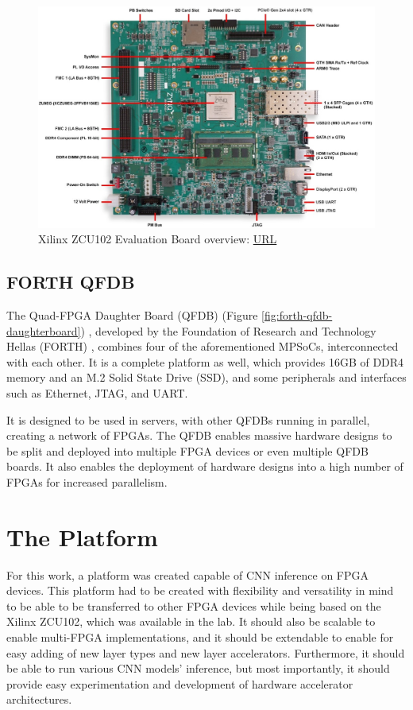\begin{figure} [H]
	\centering
	\includegraphics[width=\textwidth]{Images/Hardware/ZCU102-board-overview.jpg}
	\decoRule
	\caption[Xilinx ZCU102 Evaluation Board overview]{Xilinx ZCU102 Evaluation Board overview: \href{https://www.xilinx.com/products/boards-and-kits/ek-u1-zcu102-g.html}{URL}}
	\label{fig:ZCU102-board-overview}
\end{figure}

\subsection{FORTH QFDB}
The Quad-FPGA Daughter Board (QFDB) (Figure \ref{fig:forth-qfdb-daughterboard}) \cite{Implementation-and-Impact-of-an-Ultra-Compact-Multi-FPGA-Board-for-Large-System-Prototyping}, developed by the Foundation of Research and Technology Hellas (FORTH) \cite{FORTH}, combines four of the aforementioned MPSoCs, interconnected with each other. It is a complete platform as well, which provides 16GB of DDR4 memory and an M.2 Solid State Drive (SSD), and some peripherals and interfaces such as Ethernet, JTAG, and UART.

It is designed to be used in servers, with other QFDBs running in parallel, creating a network of FPGAs. The QFDB enables massive hardware designs to be split and deployed into multiple FPGA devices or even multiple QFDB boards. It also enables the deployment of hardware designs into a high number of FPGAs for increased parallelism.

\section{The Platform}
For this work, a platform was created capable of CNN inference on FPGA devices. This platform had to be created with flexibility and versatility in mind to be able to be transferred to other FPGA devices while being based on the Xilinx ZCU102, which was available in the lab. It should also be scalable to enable multi-FPGA implementations, and it should be extendable to enable for easy adding of new layer types and new layer accelerators. Furthermore, it should be able to run various CNN models' inference, but most importantly, it should provide easy experimentation and development of hardware accelerator architectures.

